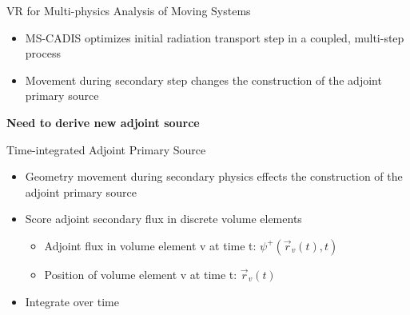 \documentclass{beamer}
\begin{document}
\begin{frame}{VR for Multi-physics Analysis of Moving Systems}
	\begin{itemize}
		\item{MS-CADIS optimizes initial radiation transport step in a coupled, multi-step
			process}
		\item{Movement during secondary step changes the construction
			of the adjoint primary source}
	\end{itemize}
	\vspace{1cm}
	\centering
		{\textbf{Need to derive new adjoint source}}

\end{frame}


\begin{frame}{Time-integrated Adjoint Primary Source}
	\begin{itemize}
	\item{Geometry movement during secondary physics effects the
			construction of the adjoint primary source}
		\item{Score adjoint secondary flux in discrete volume elements}
	   \begin{itemize}
	   \item	{Adjoint flux in volume element v at time t: 
	   	$\psi^{+}(\overrightarrow{r}_{v}(t), t)$ }
	   \item  {Position of volume element v at time t:
	   	$\overrightarrow{r}_{v}(t)$ }
	   \end{itemize}
   \item{Integrate over time}
	\end{itemize}


	\begin{center}
	\end{center}
\end{frame}
\end{document}
